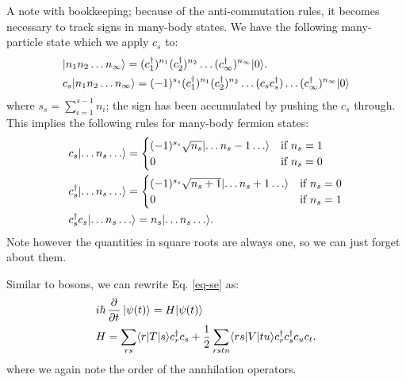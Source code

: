 A note with bookkeeping; because of the anti-commutation rules, it becomes necessary to track signs in many-body states. We have the following many-particle state which we apply $c_s$ to:
\begin{equation}
    \begin{split}
        &\lvert n_1n_2 \ldots n_\infty \rangle = (c_1^\dagger)^{n_1}(c_2^\dagger)^{n_2} \ldots (c_\infty^\dagger)^{n_\infty}\lvert 0 \rangle.
        \\  &c_s\lvert n_1n_2\ldots n_\infty \rangle = (-1)^{s_s}(c_1^\dagger)^{n_1}(c_2^\dagger)^{n_2} \ldots (c_sc_s^\dagger)\ldots (c_\infty^\dagger)^{n_\infty}\lvert 0 \rangle
    \end{split}
\end{equation}
where $s_s = \sum_{i=1}^{s-1} n_i$; the sign has been accumulated by pushing the $c_s$ through. This implies the following rules for many-body fermion states:
\begin{equation}
    \begin{split}
        &c_s\lvert \ldots n_s \ldots \rangle = \begin{cases}
            (-1)^{s_s}\sqrt{n_s}\lvert \ldots n_{s} - 1 \ldots \rangle & \text{if $n_s = 1$}
            \\ 0 & \text{if $n_s = 0$}
        \end{cases}
        \\ &c_s^\dagger\lvert \ldots n_s \ldots \rangle = \begin{cases}
            (-1)^{s_s}\sqrt{n_s+1}\lvert \ldots n_{s} + 1 \ldots \rangle & \text{if $n_s = 0$}
            \\ 0 & \text{if $n_s = 1$}
        \end{cases}
        \\ &c_s^\dagger c_s\lvert \ldots n_s \ldots \rangle = n_s\lvert \ldots n_s \ldots \rangle.
    \end{split}
\end{equation}
Note however the quantities in square roots are always one, so we can just forget about them.

Similar to bosons, we can rewrite Eq. \eqref{eq-se} as:
\begin{equation}
    \begin{split}
        &i\hbar\dpd{}{t}\ket{\psi(t)} = H\ket{\psi(t)}
        \\ &H = \sum_{rs}\bra{r}T\ket{s} c_r^\dag c_s + \frac{1}{2}\sum_{rstn}\bra{rs}V\ket{tu} c_r^\dag c_s^\dag c_u c_t.
    \end{split}
\end{equation}
where we again note the order of the annhilation operators.

